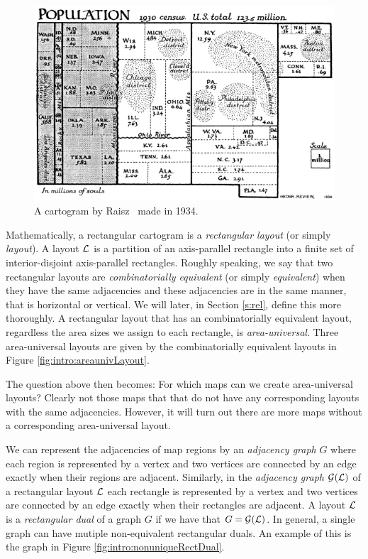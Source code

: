   \begin{figure}[!b]
    \centering
    \includegraphics[scale=.7]{introduction/img/cartogram.png}
    \caption{A cartogram by Raisz~\cite{Raisz1934} made in 1934.}
    \label{fig:intro:raisz}
  \end{figure}

  Mathematically, a rectangular cartogram is a  \emph{rectangular layout} (or simply \emph{layout}).
  A layout $\mathcal{L}$ is a partition of an axis-parallel rectangle into a finite set of interior-disjoint axis-parallel rectangles.
  Roughly speaking, we say that two rectangular layouts are \emph{combinatorially equivalent} (or simply \emph{equivalent}) when they have the same adjacencies and these adjacencies are in the same manner, that is horizontal or vertical. We will later, in Section \ref{s:rel}, define this more thoroughly.
  A rectangular layout that has an combinatorially equivalent layout, regardless the area sizes we assign to each rectangle, is \emph{area-universal}. Three area-universal layouts are given by the  combinatorially equivalent layouts in Figure \ref{fig:intro:areaunivLayout}.

  The question above then becomes: For which maps can we create area-universal layouts?
  Clearly not those maps that that do not have any corresponding layouts with the same adjacencies. However, it will turn out there are more maps without a corresponding area-universal layout.

  We can represent the adjacencies of map regions by an \emph{adjacency graph} $G$ where each region is represented by a vertex and two vertices are connected by an edge exactly when their regions are adjacent.
  Similarly, in the \emph{adjacency graph} $\mathcal{G}(\mathcal{L})$ of a rectangular layout $\mathcal{L}$ each rectangle is represented by a vertex and two vertices are connected by an edge exactly when their rectangles are adjacent.
  A layout $\mathcal{L}$ is a \emph{rectangular dual} of a graph $G$ if we have that $G = \mathcal{G}(\mathcal{L})$.
  In general, a single graph can have mutiple non-equivalent rectangular duals. An example of this is the graph in Figure \ref{fig:intro:nonuniqueRectDual}.

